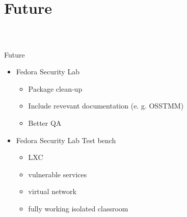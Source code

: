 \section{Future}
%
\begin{frame}
\frametitle{\\}
%
{\LARGE Future \newline}
\begin{itemize}
  \item Fedora Security Lab
    \begin{itemize}
      \item Package clean-up
      \item Include revevant documentation (e. g. OSSTMM)
      \item Better QA
    \end{itemize}
  \item Fedora Security Lab Test bench
    \begin{itemize}
      \item LXC
      \item vulnerable services
      \item virtual network
      \item fully working isolated classroom
  \end{itemize}
\end{itemize}
\end{frame}
